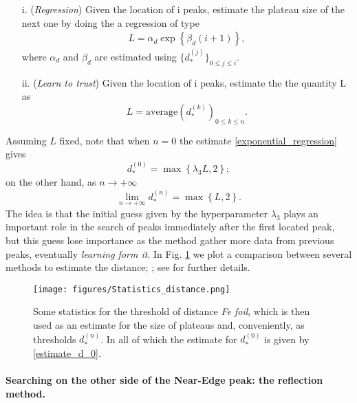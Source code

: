 \documentclass[%
 reprint,
 amsmath,amssymb,
 aps,
]{revtex4-1}
\begin{document}
\begin{enumerate}
 \item[i.] (\textit{Regression}) Given the location of i peaks, estimate the plateau size of the next one by doing the a regression of type 
 \begin{align*}
  L = \alpha_d \exp\left\{\beta_d (i+1)\right\},
 \end{align*}
where $\alpha_d$ and $\beta_d$ are estimated using  $\{d_*^{(j)}\}_{0\leq j \leq i}$. 

\item[ii.] (\textit{Learn to trust}) Given the location of i peaks, estimate the the quantity L as 
$$L = \text{average}\left(d_*^{(k)}\right)_{0\leq k \leq n}.$$
\end{enumerate}
%
%
Assuming $L$ fixed, note that when $n=0$ the estimate \eqref{exponential_regression} gives 
%
$$d_*^{(0)} = \max\left\{\lambda_3L,2 \right\};$$
%
on the other hand, as $n\to +\infty$
$$\lim_{n \to +\infty}d_*^{(n)} =  \max\left\{L,2 \right\}.$$
%
The idea is that the initial guess  given by the hyperparameter $\lambda_3$ plays an important role in the search of peaks immediately after the first located peak, but this guess lose importance as the method gather more data from previous peaks,  eventually \textit{learning form it}.  In Fig. \ref{fig:Statistics} we plot a comparison between several methods to estimate the distance; ; see \cite{github} for further details. 
%
\begin{figure}[htb]
\texttt{[image: figures/Statistics\_distance.png]}%

 
 
 \caption{Some statistics for the threshold of distance  \textit{Fe foil}, which is then used as an estimate for the size of plateaus and, conveniently, as thresholds $d_*^{(n)}$. In all of which the estimate for $d_*^{(0)}$ is given by \eqref{estimate_d_0}. \label{fig:Statistics}}
\end{figure}

\paragraph*{Searching on the other side of the Near-Edge peak: the reflection method.}\label{subsec:reflection}
\end{document}
